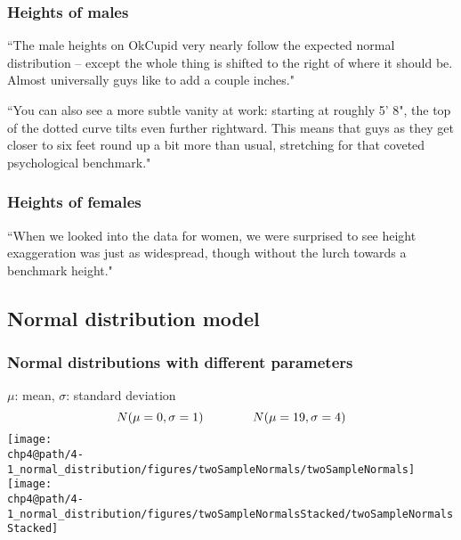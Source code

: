 \documentclass[slidestop,compress,mathserif]{beamer}
\makeatletter
\def\chp4@path{../../Chp 4}
\makeatother
\begin{document}
\begin{frame}
\frametitle{Heights of males}

{
\pause
{\footnotesize``The male heights on OkCupid very nearly follow the expected normal distribution -- except the whole thing is shifted to the right of where it should be. Almost universally guys like to add a couple inches." 

``You can also see a more subtle vanity at work: starting at roughly 5' 8", the top of the dotted curve tilts even further rightward. This means that guys as they get closer to six feet round up a bit more than usual, stretching for that coveted psychological benchmark."
}
}


\end{frame}


\begin{frame}
\frametitle{Heights of females}

{
\pause
{\footnotesize ``When we looked into the data for women, we were surprised to see height exaggeration was just as widespread, though without the lurch towards a benchmark height."
}
}

\vfill


\end{frame}


\subsection{Normal distribution model}


\begin{frame}
\frametitle{Normal distributions with different parameters}

\vspace{-0.5cm}
\begin{center}
$\mu$: mean, $\sigma$: standard deviation
\[N(\mu = 0, \sigma = 1) \hspace{1.4cm} N(\mu = 19, \sigma = 4) \]
\texttt{[image: \\chp4@path/4-1\_normal\_distribution/figures/twoSampleNormals/twoSampleNormals]} \\
\texttt{[image: \\chp4@path/4-1\_normal\_distribution/figures/twoSampleNormalsStacked/twoSampleNormalsStacked]}
\end{center}

\end{frame}
\end{document}
